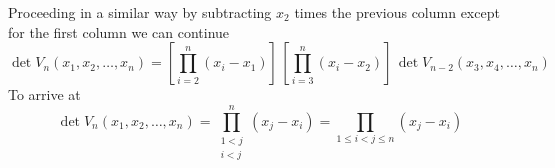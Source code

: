  Proceeding in a similar way by subtracting $x_2$ times the previous column except for the first column we can continue
$$\det{V_n(x_1,x_2,\hdots,x_n)} =  
[\prod_{i = 2}^n (x_i - x_1)] \,
[\prod_{i = 3}^n (x_i - x_2)] \, \det{V_{n-2}(x_3,x_4,\hdots,x_n)}
$$
To arrive at 
$$\det{V_n(x_1,x_2,\hdots,x_n)} =  \prod_{\substack{1 < j \\ i < j}}^n (x_j - x_i) =  \prod_{1 \le i < j \le  n } (x_j - x_i)
$$